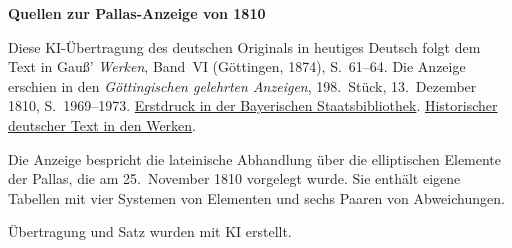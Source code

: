 \clearpage\thispagestyle{empty}
\begin{center}\textbf{Quellen zur Pallas-Anzeige von 1810}\end{center}
\noindent Diese KI-Übertragung des deutschen Originals in heutiges Deutsch folgt dem Text in Gauß’ \textit{Werken}, Band~VI (Göttingen, 1874), S.~61--64. Die Anzeige erschien in den \textit{Göttingischen gelehrten Anzeigen}, 198.~Stück, 13.~Dezember 1810, S.~1969--1973. \href{https://www.digitale-sammlungen.de/de/view/bsb10538678?page=939}{Erstdruck in der Bayerischen Staatsbibliothek}. \href{https://gdz.sub.uni-goettingen.de/id/PPN236007467}{Historischer deutscher Text in den Werken}.
\par\smallskip\noindent Die Anzeige bespricht die lateinische Abhandlung über die elliptischen Elemente der Pallas, die am 25.~November 1810 vorgelegt wurde. Sie enthält eigene Tabellen mit vier Systemen von Elementen und sechs Paaren von Abweichungen.
\par\smallskip\noindent Übertragung und Satz wurden mit KI erstellt.
\clearpage
